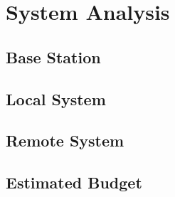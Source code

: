 \documentclass[12pt, letterpaper]{report}
\begin{document}


\chapter{System Analysis}

\section{Base Station}


\section{Local System}


\section{Remote System}


\section{Estimated Budget}







\end{document}
